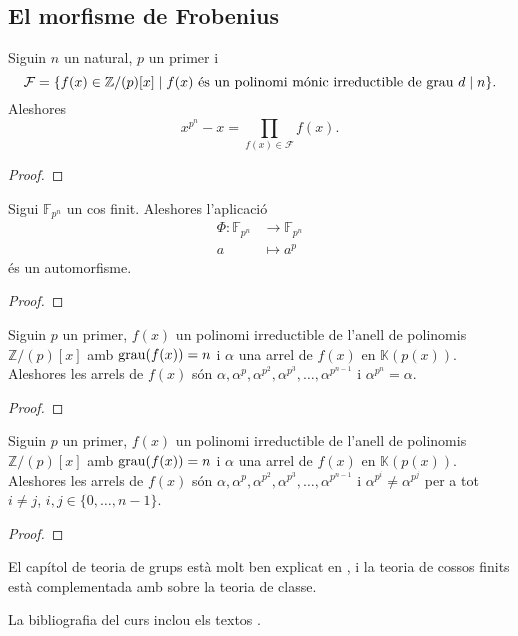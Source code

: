 \documentclass[../Apunts.tex]{subfiles}
\begin{document}
	\subsection{El morfisme de Frobenius}	%
	\begin{theorem}
		Siguin \(n\) un natural, \(p\) un primer i
		\[\mathcal{F}=\{f(x)\in\mathbb{Z}/(p)[x]\mid f(x)\text{ és un polinomi mónic irreductible de grau }d\mathrel{|} n\}.\]
		Aleshores
		\[x^{p^{n}}-x=\prod_{f(x)\in\mathcal{F}}f(x).\]
		\begin{proof}
		\end{proof}
	\end{theorem}
	\begin{proposition}
		Sigui \(\mathbb{F}_{p^{n}}\) un cos finit. Aleshores l'aplicació
		\begin{align*}
		\Phi\colon\mathbb{F}_{p^{n}}&\longrightarrow\mathbb{F}_{p^{n}}\\
		a&\longmapsto a^{p}
		\end{align*}
		és un automorfisme.
		\begin{proof}
		\end{proof}
	\end{proposition}
	\begin{theorem}
		Siguin \(p\) un primer, \(f(x)\) un polinomi irreductible de l'anell de polinomis \(\mathbb{Z}/(p)[x]\) amb \(\operatorname{grau}(f(x))=n\) i \(\alpha\) una arrel de \(f(x)\) en \(\mathbb{K}(p(x))\). Aleshores les arrels de \(f(x)\) són \(\alpha,\alpha^{p},\alpha^{p^{2}},\alpha^{p^{3}},\dots,\alpha^{p^{n-1}}\) i \(\alpha^{p^{n}}=\alpha\).
		\begin{proof}
		\end{proof}
	\end{theorem}
	\begin{theorem}
		Siguin \(p\) un primer, \(f(x)\) un polinomi irreductible de l'anell de polinomis \(\mathbb{Z}/(p)[x]\) amb \(\operatorname{grau}(f(x))=n\) i \(\alpha\) una arrel de \(f(x)\) en \(\mathbb{K}(p(x))\). Aleshores les arrels de \(f(x)\) són \(\alpha,\alpha^{p},\alpha^{p^{2}},\alpha^{p^{3}},\dots,\alpha^{p^{n-1}}\) i \(\alpha^{p^{i}}\neq\alpha^{p^{j}}\) per a tot \(i\neq j\), \(i,j\in\{0,\dots,n-1\}\).
		\begin{proof}
		\end{proof}
	\end{theorem}
	\printbibliography
	El capítol de teoria de grups està molt ben explicat en \cite{NumerosGruposyAnillos}, i la teoria de cossos finits està complementada amb \cite{AntoineRosaCampsMoncasiIntroduccioAlgebraAbstracta} sobre la teoria de classe.
	
	La bibliografia del curs inclou els textos \cite{NumerosGruposyAnillos, AntoineRosaCampsMoncasiIntroduccioAlgebraAbstracta, CedoAlgebraBasica, CohnBasicAlgebra, FelixConcepcionSebastianIntroduccionAlAlgebra, FraleighFirstCourseAbstractAlgebra, HungerfordAlgebra}.
\end{document}
